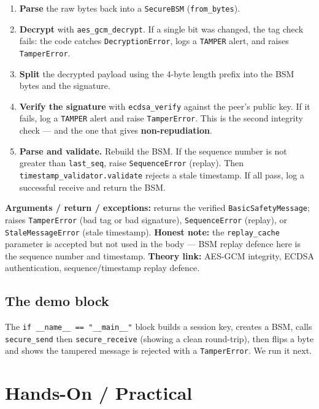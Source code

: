 \documentclass[11pt,a4paper]{article}
\begin{document}
\begin{enumerate}
  \item \textbf{Parse} the raw bytes back into a \texttt{SecureBSM}
        (\texttt{from\_bytes}).
  \item \textbf{Decrypt} with \texttt{aes\_gcm\_decrypt}. If a single bit was
        changed, the tag check fails: the code catches \texttt{DecryptionError},
        logs a \texttt{TAMPER} alert, and raises \texttt{TamperError}.
  \item \textbf{Split} the decrypted payload using the 4-byte length prefix into
        the BSM bytes and the signature.
  \item \textbf{Verify the signature} with \texttt{ecdsa\_verify} against the
        peer's public key. If it fails, log a \texttt{TAMPER} alert and raise
        \texttt{TamperError}. This is the second integrity check --- and the one
        that gives \textbf{non-repudiation}.
  \item \textbf{Parse and validate.} Rebuild the BSM. If the sequence number is
        not greater than \texttt{last\_seq}, raise \texttt{SequenceError}
        (replay). Then \texttt{timestamp\_validator.validate} rejects a stale
        timestamp. If all pass, log a successful receive and return the BSM.
\end{enumerate}
\textbf{Arguments / return / exceptions:} returns the verified
\texttt{BasicSafetyMessage}; raises \texttt{TamperError} (bad tag or bad
signature), \texttt{SequenceError} (replay), or \texttt{StaleMessageError}
(stale timestamp). \textbf{Honest note:} the \texttt{replay\_cache} parameter is
accepted but not used in the body --- BSM replay defence here is the sequence
number and timestamp. \textbf{Theory link:} AES-GCM integrity, ECDSA
authentication, sequence/timestamp replay defence.

\subsection{The demo block}
The \texttt{if \_\_name\_\_ == "\_\_main\_\_"} block builds a session key, creates
a BSM, calls \texttt{secure\_send} then \texttt{secure\_receive} (showing a clean
round-trip), then flips a byte and shows the tampered message is rejected with a
\texttt{TamperError}. We run it next.

\section{Hands-On / Practical}
\end{document}
